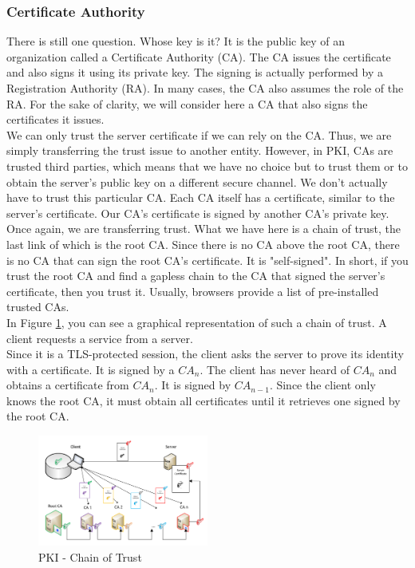 \subsubsection{Certiﬁcate Authority}\cite{b38}
There is still one question. Whose key is it? It is the public key of an 
organization called a Certificate Authority (CA). The CA issues the certificate and 
also signs it using its private key. The signing is actually performed by a 
Registration Authority (RA). In many cases, the CA also assumes the role of the RA. 
For the sake of clarity, we will consider here a CA that also signs the certificates 
it issues.
\\
We can only trust the server certificate if we can rely on the CA. Thus, we are 
simply transferring the trust issue to another entity. However, in PKI, CAs are 
trusted third parties, which means that we have no choice but to trust them or to 
obtain the server's public key on a different secure channel. We don't actually have 
to trust this particular CA. Each CA itself has a certificate, similar to the server's 
certificate. Our CA's certificate is signed by another CA's private key. Once again, 
we are transferring trust. What we have here is a chain of trust, the last link of which 
is the root CA. Since there is no CA above the root CA, there is no CA that can sign 
the root CA's certificate. It is "self-signed". In short, if you trust the root CA and 
find a gapless chain to the CA that signed the server's certificate, then you trust it. 
Usually, browsers provide a list of pre-installed trusted CAs.
\\
In Figure \ref{Fig.2: PKI_Chain_of_Trust}, you can see a graphical representation of 
such a chain of trust. A client requests a service from a server.
\\
Since it is a TLS-protected session, the client asks the server to prove its identity 
with a certificate. It is signed by a $CA_n$. The client has never heard of $CA_n$ and obtains 
a certificate from $CA_n$. It is signed by $CA_{n-1}$. Since the client only knows the root CA, 
it must obtain all certificates until it retrieves one signed by the root CA.

\begin{figure}[H] %
    \centering %
    \includegraphics[width=0.5\textwidth]{figures/PKI_Chain_of_Trust.png} %
    \caption{PKI - Chain of Trust} %
    \label{Fig.2: PKI_Chain_of_Trust} %
\end{figure}

